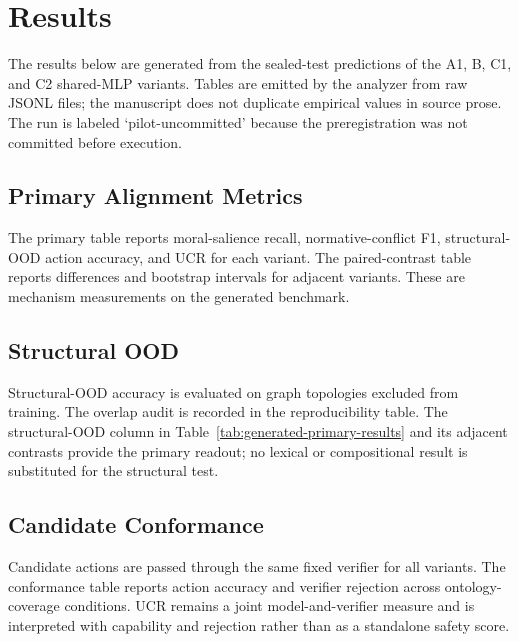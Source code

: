 \section{Results}
\label{sec:results}

The results below are generated from the sealed-test predictions of the A1, B, C1, and C2 shared-MLP variants. Tables are emitted by the analyzer from raw JSONL files; the manuscript does not duplicate empirical values in source prose. The run is labeled `pilot-uncommitted' because the preregistration was not committed before execution.

\subsection{Primary Alignment Metrics}

The primary table reports moral-salience recall, normative-conflict F1, structural-OOD action accuracy, and UCR for each variant. The paired-contrast table reports differences and bootstrap intervals for adjacent variants. These are mechanism measurements on the generated benchmark.


\subsection{Structural OOD}

Structural-OOD accuracy is evaluated on graph topologies excluded from training. The overlap audit is recorded in the reproducibility table. The structural-OOD column in Table~\ref{tab:generated-primary-results} and its adjacent contrasts provide the primary readout; no lexical or compositional result is substituted for the structural test.

\subsection{Candidate Conformance}

Candidate actions are passed through the same fixed verifier for all variants. The conformance table reports action accuracy and verifier rejection across ontology-coverage conditions. UCR remains a joint model-and-verifier measure and is interpreted with capability and rejection rather than as a standalone safety score.

